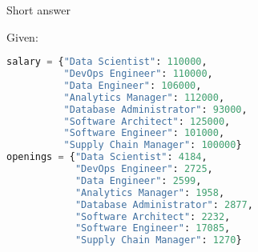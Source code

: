 \documentclass[addpoints,9pt]{exam}
\begin{document}
\begin{questions}
\begin{parts}
\end{parts}

\newpage

\question Short answer

Given:
\begin{lstlisting}[language=Python]
salary = {"Data Scientist": 110000,
          "DevOps Engineer": 110000,
          "Data Engineer": 106000,
          "Analytics Manager": 112000,
          "Database Administrator": 93000,
          "Software Architect": 125000,
          "Software Engineer": 101000,
          "Supply Chain Manager": 100000}
openings = {"Data Scientist": 4184,
            "DevOps Engineer": 2725,
            "Data Engineer": 2599,
            "Analytics Manager": 1958,
            "Database Administrator": 2877,
            "Software Architect": 2232,
            "Software Engineer": 17085,
            "Supply Chain Manager": 1270}
\end{lstlisting}

\end{questions}
\end{document}
